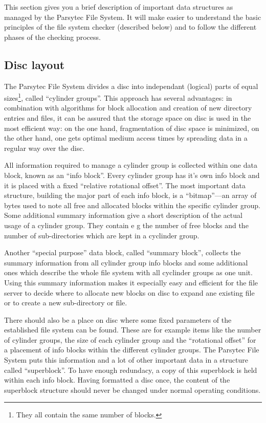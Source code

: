 This section gives you a brief description of important data structures as 
managed by the Parsytec File System. It will make easier to understand the 
basic principles of the file system checker (described below) and to follow 
the different phases of the checking process.

\subsection{Disc layout}

The Parsytec File System divides a disc into independant (logical) parts of 
equal sizes\footnote{They all contain the same number of blocks.}, called 
``cylinder groups''. This approach has
several advantages: in combination with algorithms for block allocation and
creation of new directory entries and files, it can be assured that the
storage space on disc is used in the most efficient way:  on the one hand,
fragmentation of disc space is minimized, on the other hand, one gets optimal
medium access times by spreading data in a regular way over the disc.

All information required to manage a cylinder group is collected within one 
data block, known as an ``\/info block''. Every
cylinder group has it's own info block and it is placed with a fixed
``relative rotational offset''. The
most important data structure, building the major part of each info block, is
a ``bitmap''---an array of bytes used to note all free and allocated blocks
within the specific cylinder group. Some additional summary information give
a short description of the actual usage of a cylinder group. They contain e g
the number of free blocks and the number of sub-directories which are kept in 
a cyclinder group.

Another ``special purpose'' data block, called
``summary block'', collects the summary
information from all cylinder group info blocks and some additional ones which
describe the whole file system with all cyclinder groups as one unit. Using
this summary information makes it especially easy and efficient for the file
server to decide where to allocate new blocks on disc to expand ane existing
file or to create a new sub-directory or file.

There should also be a place on disc where some fixed parameters of the
established file system can be found. These are for example items like the 
number of cylinder groups, the size of each cylinder group and the 
``rotational offset'' for a placement of info blocks within the different 
cylinder groups. The Parsytec File System puts this information and a lot of
other important data in a structure called ``superblock''.
To have enough redundacy, a copy of this superblock is held within each info
block. Having formatted a disc once, the content of the superblock structure
should never be changed under normal operating conditions.


